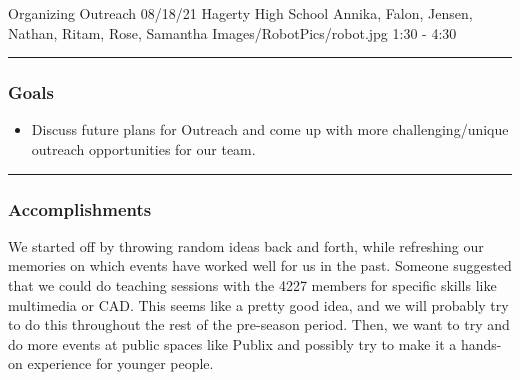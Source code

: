 \insertmeeting 
	{Organizing Outreach} 
	{08/18/21}
	{Hagerty High School}
	{Annika, Falon, Jensen, Nathan, Ritam, Rose, Samantha}
	{Images/RobotPics/robot.jpg}
	{1:30 - 4:30}
	
\noindent\hfil\rule{\textwidth}{.4pt}\hfil
\subsubsection*{Goals}
\begin{itemize}
    \item Discuss future plans for Outreach and come up with more challenging/unique outreach opportunities for our team.  

\end{itemize} 

\noindent\hfil\rule{\textwidth}{.4pt}\hfil

\subsubsection*{Accomplishments}
We started off by throwing random ideas back and forth, while refreshing our memories on which events have worked well for us in the past. Someone suggested that we could do teaching sessions with the 4227 members for specific skills like multimedia or CAD. This seems like a pretty good idea, and we will probably try to do this throughout the rest of the pre-season period. Then, we want to try and do more events at public spaces like Publix and possibly try to make it a hands-on experience for younger people.

